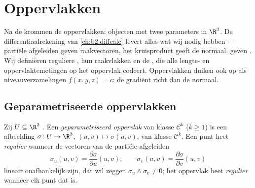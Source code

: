 \chapter{Oppervlakken}\label{ch:b2:surfaces}

Na de krommen de oppervlakken: objecten met twee parameters in
$\R^3$. De differentiaalrekening van \cref{ch:b2:diffcalc} levert
alles wat wij nodig hebben --- partiële afgeleiden geven
raakvectoren, het kruisproduct geeft de normaal, 
geven . Wij definiëren reguliere , hun raakvlakken en de \emph{}, die alle lengte- en oppervlaktemetingen op het
oppervlak codeert. Oppervlakken duiken ook op als
niveauverzamelingen $f(x, y, z) = c$; de gradiënt richt dan de
normaal.

\section{Geparametriseerde oppervlakken}

\begin{definition}\label{def:b2:surfaces:param}
Zij $U \subseteq \R^2$ . Een \emph{geparametriseerd
oppervlak} van klasse
$\mathcal{C}^k$ ($k \geq 1$) is een afbeelding $\sigma \colon U \to
\R^3$, $(u, v) \mapsto \sigma(u, v)$, van klasse $\mathcal{C}^k$.
Een punt heet \emph{regulier} wanneer de vectoren van de partiële
afgeleiden
\[
\sigma_u(u, v) = \frac{\partial\sigma}{\partial u}(u,v),
\qquad
\sigma_v(u, v) = \frac{\partial\sigma}{\partial v}(u,v)
\]
lineair onafhankelijk zijn, dat wil zeggen $\sigma_u \wedge
\sigma_v \neq 0$; het oppervlak heet \emph{regulier} wanneer elk
punt dat is.
\end{definition}

